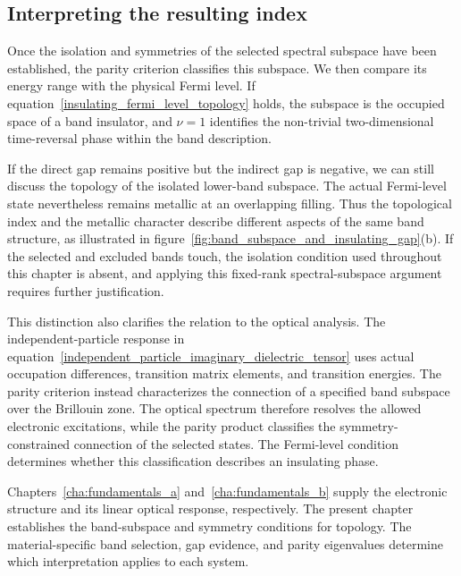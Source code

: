 \subsection{Interpreting the resulting index}

Once the isolation and symmetries of the selected spectral subspace have been established, the parity criterion classifies this subspace.
We then compare its energy range with the physical Fermi level.
If equation~\eqref{insulating_fermi_level_topology} holds,
the subspace is the occupied space of a band insulator,
and $\nu=1$ identifies the non-trivial two-dimensional time-reversal phase within the band description.

If the direct gap remains positive but the indirect gap is negative,
we can still discuss the topology of the isolated lower-band subspace.
The actual Fermi-level state nevertheless remains metallic at an overlapping filling.
Thus the topological index and the metallic character describe different aspects of the same band structure,
as illustrated in figure~\ref{fig:band_subspace_and_insulating_gap}(b).
If the selected and excluded bands touch,
the isolation condition used throughout this chapter is absent,
and applying this fixed-rank spectral-subspace argument requires further justification.

This distinction also clarifies the relation to the optical analysis.
The independent-particle response in equation~\eqref{independent_particle_imaginary_dielectric_tensor}
uses actual occupation differences, transition matrix elements, and transition energies.
The parity criterion instead characterizes the connection of a specified band subspace over the Brillouin zone.
The optical spectrum therefore resolves the allowed electronic excitations,
while the parity product classifies the symmetry-constrained connection of the selected states.
The Fermi-level condition determines whether this classification describes an insulating phase.

Chapters~\ref{cha:fundamentals_a} and~\ref{cha:fundamentals_b} supply the electronic structure and its linear optical response, respectively.
The present chapter establishes the band-subspace and symmetry conditions for topology.
The material-specific band selection, gap evidence, and parity eigenvalues determine which interpretation applies to each system.
